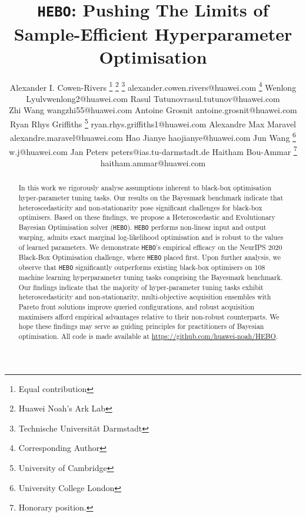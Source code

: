 \documentclass[jair,twoside,11pt,theapa]{article}
\theoremstyle{definition}
\begin{document}
\title{\texttt{HEBO}: Pushing The Limits of Sample-Efficient Hyperparameter Optimisation}

\author{\name Alexander I. Cowen-Rivers \thanks{\:\:Equal contribution} \thanks{\:\:Huawei Noah's Ark Lab} \thanks{\:\:Technische Universität Darmstadt} \email alexander.cowen.rivers@huawei.com \thanks{\:\:Corresponding Author}
\AND
\name Wenlong Lyu\footnotemark[1] \footnotemark[2] \email lvwenlong2@huawei.com
\AND
\name Rasul Tutunov\footnotemark[1] \footnotemark[2] \email rasul.tutunov@huawei.com \\
\AND
\name Zhi Wang \footnotemark[2] \email wangzhi55@huawei.com
\AND
\name Antoine Grosnit \footnotemark[2]  \email  antoine.grosnit@huawei.com
\AND
\name Ryan Rhys Griffiths \footnotemark[2] \thanks{\:\:University of Cambridge}   \email ryan.rhys.griffiths1@huawei.com
\AND
\name Alexandre Max Maravel \footnotemark[2]   \email alexandre.maravel@huawei.com
\AND
\name Hao Jianye \footnotemark[2]  \email haojianye@huawei.com
\AND
\name Jun Wang \footnotemark[2] \thanks{\:\:University College London}  \email w.j@huawei.com
\AND
\name Jan Peters \footnotemark[3]   \email peters@ias.tu-darmstadt.de
\AND
\name Haitham Bou-Ammar \footnotemark[2] \footnotemark[6] \thanks{\:\: Honorary position.}  \email  haitham.ammar@huawei.com
}



\maketitle

\begin{abstract}
In this work we rigorously analyse assumptions inherent to black-box optimisation hyper-parameter tuning tasks. Our results on the Bayesmark benchmark indicate that heteroscedasticity and non-stationarity pose significant challenges for black-box optimisers. Based on these findings, we propose a Heteroscedastic and Evolutionary Bayesian Optimisation solver (\texttt{HEBO}). \texttt{HEBO} performs non-linear input and output warping, admits exact marginal log-likelihood optimisation and is robust to the values of learned parameters. We demonstrate \texttt{HEBO}'s empirical efficacy on the NeurIPS 2020 Black-Box Optimisation challenge, where \texttt{HEBO} placed first. Upon further analysis, we observe that \texttt{HEBO} significantly outperforms existing black-box optimisers on 108 machine learning hyperparameter tuning tasks comprising the Bayesmark benchmark. Our findings indicate that the majority of hyper-parameter tuning tasks exhibit heteroscedasticity and non-stationarity, multi-objective acquisition ensembles with Pareto front solutions improve queried configurations, and robust acquisition maximisers afford empirical advantages relative to their non-robust counterparts. We hope these findings may serve as guiding principles for practitioners of Bayesian optimisation. All code is made available at \href{https://github.com/huawei-noah/HEBO}{https://github.com/huawei-noah/HEBO}.
\end{abstract}
\end{document}
